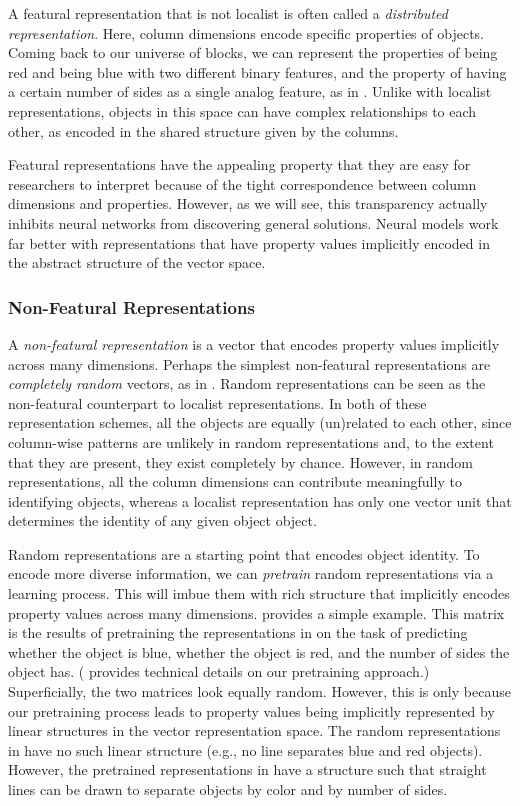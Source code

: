 \documentclass[9pt,twocolumn,twoside,lineno]{pnas-new}
\newcommand{\tech}[1]{\emph{#1}}
\begin{document}
{A featural representation that is not localist is often called a \tech{distributed representation}. Here, column dimensions encode specific properties of objects. Coming back to our universe of blocks, we can represent the properties of being red and being blue with two different binary features, and the property of having a certain number of sides as a single analog feature, as in . Unlike with localist representations, objects in this space can have complex relationships to each other, as encoded in the shared structure given by the columns.

Featural representations have the appealing property that they are easy for researchers to interpret because of the tight correspondence between column dimensions and properties. However, as we will see, this transparency actually inhibits neural networks from discovering general solutions. Neural models work far better with representations that have property values implicitly encoded in the abstract structure of the vector space.


\subsubsection*{Non-Featural Representations}

A \tech{non-featural representation} is a vector that encodes property values implicitly across many dimensions. Perhaps the simplest non-featural representations are \tech{completely random} vectors, as in . Random representations can be seen as the non-featural counterpart to localist representations. In both of these representation schemes, all the objects are equally (un)related to each other, since column-wise patterns are unlikely in random representations and, to the extent that they are present, they exist completely by chance. However, in random representations, all the column dimensions can contribute meaningfully to identifying objects, whereas a localist representation has only one vector unit that determines the identity of any given object object.

Random representations are a starting point that encodes object identity. To encode more diverse information, we can \tech{pretrain} random representations via a learning process. This will imbue them with rich structure that implicitly encodes property values across many dimensions.  provides a simple example. This matrix is the results of pretraining the representations in  on the task of predicting whether the object is blue, whether the object is red, and the number of sides the object has. ( provides technical details on our pretraining approach.) Superficially, the two matrices look equally random. However, this is only because our pretraining process leads to property values being implicitly represented by linear structures in the vector representation space.  The random representations in  have no such linear structure (e.g., no line separates blue and red objects).  However, the pretrained representations in  have a structure such that straight lines can be drawn to separate objects by color and by number of sides.

}
\end{document}
